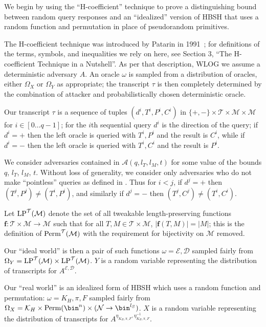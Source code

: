 \documentclass[eprint.tex]{subfiles}
\begin{document}
We begin by using the ``H-coefficient'' technique to prove a distinguishing bound
between random query responses and
an ``idealized'' version of HBSH that uses a random function and permutation
in place of pseudorandom primitives.

The H-coefficient technique was introduced by Patarin in 1991~\cite{hco}; for definitions
of the terms, symbols, and inequalities we rely on here, see \cite{hco2} Section 3,
``The H-coefficient Technique in a Nutshell''.
As per that description, WLOG we assume a deterministic adversary $A$. An oracle $\omega$ is
sampled from a distribution of oracles, either $\Omega_X$ or
$\Omega_Y$ as appropriate; the transcript $\tau$ is then completely determined by the combination
of attacker and probabilistically chosen deterministic oracle.

Our transcript $\tau$ is a sequence of tuples
$(d^i, T^i, P^i, C^i)$
in
$\{+, -\} \times \mathcal{T} \times \mathcal{M} \times \mathcal{M}$
for $i \in [0 \ldots q-1]$;
for the $i$th sequential query
$d^i$ is the direction of the query;
if $d^i = +$ then the left oracle is queried with $T^i, P^i$ and the result is $C^i$,
while if $d^i = -$ then the left oracle is queried with $T^i, C^i$ and the result is $P^i$.

We consider adversaries contained in $\mathcal{A}(q, l_T, l_M, t)$ for some value of
the bounds $q$, $l_T$, $l_M$, $t$.
Without loss of generality, we consider only adversaries who do not make ``pointless''
queries as defined in \cite{cmc}. Thus for $i < j$, if $d^j = +$ then
$(T^j, P^j) \neq (T^i, P^i)$, and similarly if $d^j = -$ then
$(T^j, C^j) \neq (T^i, C^i)$.

Let $\operatorname{LP}^\mathcal{T}(\mathcal{M})$ denote the set of all
tweakable length-preserving functions
$\bm{f} : \mathcal{T} \times \mathcal{M} \rightarrow \mathcal{M}$
such that for all $T, M \in \mathcal{T} \times \mathcal{M}$,
$|\bm{f}(T, M)| = |M|$;
this is the definition of $\operatorname{Perm}^\mathcal{T}(\mathcal{M})$ with
the requirement for bijectivity on $\mathcal{M}$ removed.

Our ``ideal world''
is then a pair of such functions
$\omega = \mathcal{E}, \mathcal{D}$
sampled fairly from
$\Omega_Y = \operatorname{LP}^\mathcal{T}(\mathcal{M}) \times \operatorname{LP}^\mathcal{T}(\mathcal{M})$.
$Y$ is a random variable representing the distribution of transcripts for
$A^{\mathcal{E}, \mathcal{D}}$.

Our ``real world'' is an idealized form of HBSH which uses a random function and permutation:
$\omega = K_H, \pi, F$
sampled fairly from
$\Omega_X = \mathcal{K}_H \times \Perm(\bin^n) \times (\mathcal{N} \rightarrow \bin^{l_S})$.
$X$ is a random variable representing the distribution of transcripts for
$A^{\eta_{K_H, \pi, F}, \eta_{K_H, \pi, F}^{-1}}$.
\end{document}
